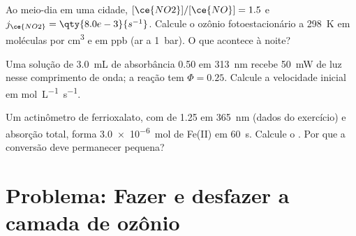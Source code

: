 \begin{exercise}[$\star\star\star$]\label{exo:b3:photochemistry:10}
Ao meio-dia em uma cidade, $[\ce{NO2}]/[\ce{NO}] = 1.5$ e $j_{\ce{NO2}} = \qty{8.0e-3}{s^{-1}}$. Calcule o
ozônio fotoestacionário a \qty{298}{K} em moléculas por \unit{cm^3} e em ppb (ar a \qty{1}{bar}).
O que acontece à noite?
\end{exercise}

\begin{exercise}[$\star\star\star$]\label{exo:b3:photochemistry:11}
Uma solução de \qty{3.0}{mL} de absorbância 0.50 em \qty{313}{nm} recebe \qty{50}{mW} de
luz nesse comprimento de onda; a reação tem $\Phi = 0.25$. Calcule a velocidade inicial em
\unit{mol.L^{-1}.s^{-1}}.
\end{exercise}

\begin{exercise}[$\star\star\star$]\label{exo:b3:photochemistry:12}
Um actinômetro de ferrioxalato, com  de 1.25 em \qty{365}{nm} (dados
do exercício) e absorção total, forma \qty{3.0e-6}{mol} de Fe(II) em \qty{60}{s}.
Calcule o . Por que a conversão deve permanecer pequena?
\end{exercise}

\section{Problema: Fazer e desfazer a camada de ozônio}

